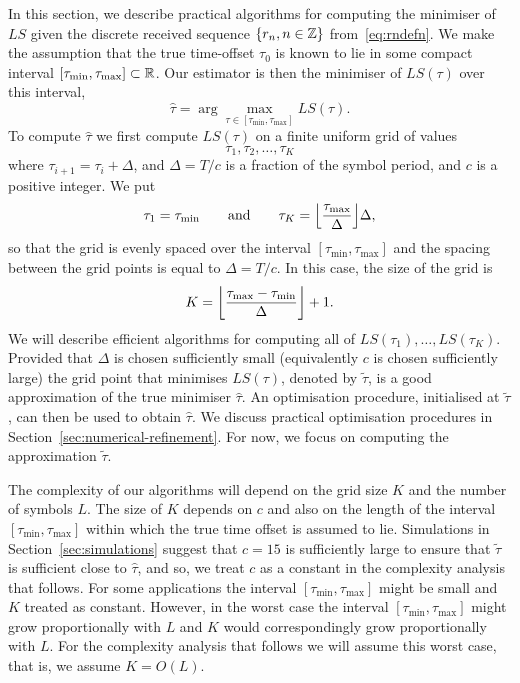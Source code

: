 \documentclass[journal]{IEEEtranTCOM}
\begin{document}
In this section, we describe practical algorithms for computing the minimiser of $LS$ given the discrete received sequence $\{r_n, n \in {\mathbb Z}\}$ from~\eqref{eq:rndefn}.  We make the assumption that the true time-offset $\tau_0$ is known to lie in some compact interval $[\tau_{\text{min}}, \tau_{\text{max}}] \subset {\mathbb R}$.  Our estimator is then the minimiser of $LS(\tau)$ over this interval,
\[
\hat{\tau} = \arg\max_{\tau \in [\tau_{\text{min}}, \tau_{\text{max}}]} LS(\tau).
\]
To compute $\hat{\tau}$ we first compute $LS(\tau)$ on a finite uniform grid of values
\[
\tau_{1}, \tau_2, \dots, \tau_K
\]
where $\tau_{i+1} = \tau_i + \Delta$, and $\Delta = T/c$ is a fraction of the symbol period, and $c$ is a positive integer.  We put
\[
\tau_1 = \tau_{\text{min}} \qquad \text{and} \qquad \tau_K = {\left\lfloor \frac{\tau_{\text{max}}}{\Delta} \right\rfloor}\Delta,
\]
so that the grid is evenly spaced over the interval $[\tau_{\text{min}}, \tau_{\text{max}}]$ and the spacing between the grid points is equal to $\Delta = T/c$.  In this case, the size of the grid is
\[
K = {\left\lfloor \frac{\tau_{\text{max}} - \tau_{\text{min}}}{\Delta} \right\rfloor} + 1.
\]  
We will describe efficient algorithms for computing all of $LS(\tau_1), \dots, LS(\tau_K)$.  Provided that $\Delta$ is chosen sufficiently small (equivalently $c$ is chosen sufficiently large) the grid point that minimises $LS(\tau)$, denoted by $\tilde{\tau}$, is a good approximation of the true minimiser $\hat{\tau}$.  An optimisation procedure, initialised at $\tilde{\tau}$, can then be used to obtain $\hat{\tau}$.  %
We discuss practical optimisation procedures in Section~\ref{sec:numerical-refinement}.  For now, we focus on computing the approximation $\tilde{\tau}$.

The complexity of our algorithms will depend on the grid size $K$ and the number of symbols $L$.  The size of $K$ depends on $c$ and also on the length of the interval $[\tau_{\text{min}}, \tau_{\text{max}}]$ within which the true time offset is assumed to lie.  Simulations in Section~\ref{sec:simulations} suggest that $c = 15$ is sufficiently large to ensure that $\tilde{\tau}$ is sufficient close to $\hat{\tau}$, and so, we treat $c$ as a constant in the complexity analysis that follows.   For some applications the interval $[\tau_{\text{min}}, \tau_{\text{max}}]$ might be small and $K$ treated as constant.  However, in the worst case the interval $[\tau_{\text{min}}, \tau_{\text{max}}]$ might grow proportionally with $L$ and $K$ would correspondingly grow proportionally with $L$.  For the complexity analysis that follows we will assume this worst case, that is, we assume $K = O(L)$.
\end{document}
